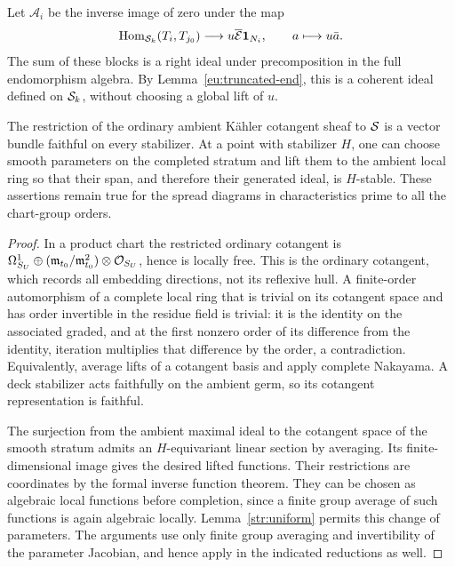 Let $\mathcal A_i$ be the inverse image of zero under the map
\begin{equation}\label{eu:right-ideal}
 \operatorname{Hom}_{\mathcal S_k}(T_i,T_{j_0})\longrightarrow
       u\overline{\mathcal E}\mathbf1_{N_i},\qquad a\longmapsto u\bar a.
\end{equation}
The sum of these blocks is a right ideal under precomposition in the
full endomorphism algebra.  By Lemma~\ref{eu:truncated-end}, this is a
coherent ideal defined on $\mathcal S_k$, without choosing a global lift of
$u$.

\begin{lemma}\label{str:stabilizer-parameters}
The restriction of the ordinary ambient K\"ahler cotangent sheaf to
$\mathcal S$ is a vector bundle faithful on every stabilizer.  At a point with
stabilizer $H$, one can choose smooth parameters on the completed
stratum and lift them to the ambient local ring so that their span,
and therefore their generated ideal, is $H$-stable.  These assertions
remain true for the spread diagrams in characteristics prime to all
the chart-group orders.
\end{lemma}

\begin{proof}
In a product chart the restricted ordinary cotangent is
$\Omega^1_{S_U}\oplus
(\mathfrak m_{t_0}/\mathfrak m_{t_0}^2)\otimes\mathcal O_{S_U}$, hence is
locally free.  This is the ordinary cotangent, which records all
embedding directions, not its reflexive hull.  A finite-order
automorphism of a complete local ring that is trivial on its
cotangent space and has order invertible in the residue field is
trivial: it is the identity on the associated graded, and at the first
nonzero order of its difference from the identity, iteration multiplies
that difference by the order, a contradiction.  Equivalently, average
lifts of a cotangent basis and apply complete Nakayama.  A deck
stabilizer acts faithfully on the ambient germ, so its cotangent
representation is faithful.

The surjection from the ambient maximal ideal to the cotangent space
of the smooth stratum admits an $H$-equivariant linear section by
averaging.  Its finite-dimensional image gives the desired lifted
functions.  Their restrictions are coordinates by the formal inverse
function theorem.  They can be chosen as algebraic local functions
before completion, since a finite group average of such functions is
again algebraic locally.  Lemma~\ref{str:uniform} permits this change
of parameters.  The arguments use only finite group averaging and
invertibility of the parameter Jacobian, and hence apply in the
indicated reductions as well.
\end{proof}

